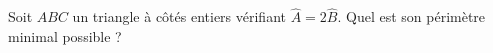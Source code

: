 Soit $ABC$ un triangle à côtés entiers vérifiant $\hat{A} = 2\hat{B}$. Quel est son périmètre minimal possible ?
